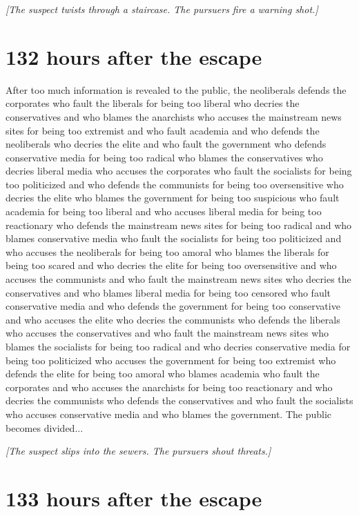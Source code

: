\documentclass{report}
\begin{document}
\textit{[The suspect twists through a staircase. The pursuers fire a warning shot.]}


\section*{132 \small{hours after the escape}}

After too much information is revealed to the public, the neoliberals defends the corporates who fault the liberals for being too liberal who decries the conservatives and who blames the anarchists who accuses the mainstream news sites for being too extremist and who fault academia and who defends the neoliberals who decries the elite and who fault the government who defends conservative media for being too radical who blames the conservatives who decries liberal media who accuses the corporates who fault the socialists for being too politicized and who defends the communists for being too oversensitive who decries the elite who blames the government for being too suspicious who fault academia for being too liberal and who accuses liberal media for being too reactionary who defends the mainstream news sites for being too radical and who blames conservative media who fault the socialists for being too politicized and who accuses the neoliberals for being too amoral who blames the liberals for being too scared and who decries the elite for being too oversensitive and who accuses the communists and who fault the mainstream news sites who decries the conservatives and who blames liberal media for being too censored who fault conservative media and who defends the government for being too conservative and who accuses the elite who decries the communists who defends the liberals who accuses the conservatives and who fault the mainstream news sites who blames the socialists for being too radical and who decries conservative media for being too politicized who accuses the government for being too extremist who defends the elite for being too amoral who blames academia who fault the corporates and who accuses the anarchists for being too reactionary and who decries the communists who defends the conservatives and who fault the socialists who accuses conservative media and who blames the government. The public becomes divided...

\textit{[The suspect slips into the sewers. The pursuers shout threats.]}


\section*{133 \small{hours after the escape}}
\end{document}
